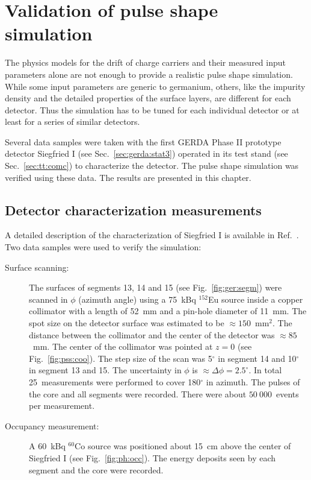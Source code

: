 \chapter{Validation of pulse shape simulation}
\label{cha:psa}
The physics models \cite{miha, bart} for the drift of charge carriers
and their measured input parameters \cite{miha, bart} alone are not
enough to provide a realistic pulse shape simulation. While some input
parameters are generic to germanium, others, like the impurity density
and the detailed properties of the surface layers, are different for
each detector. Thus the simulation has to be tuned for each individual
detector or at least for a series of similar detectors.

Several data samples were taken with the first GERDA Phase II
prototype detector Siegfried I (see Sec.~\ref{sec:gerda:stat3})
operated in its test stand (see Sec.~\ref{sec:tt:comc}) to
characterize the detector. The pulse shape simulation was verified
using these data. The results are presented in this chapter.

\section{Detector characterization measurements}
\label{sec:psa:char}
A detailed description of the characterization of Siegfried I is
available in Ref.~\cite{Sie07}. Two data samples were used to verify
the simulation:
\begin{description}
\item[Surface scanning:] The surfaces of segments 13, 14 and 15 (see
Fig.~\ref{fig:ger:segm}) were scanned in $\phi$ (azimuth angle) using
a 75~kBq $^{152}$Eu source inside a copper collimator with a length of
52~mm and a pin-hole diameter of 11~mm. The spot size on the detector
surface was estimated to be $\approx 150$~mm$^{2}$. The distance
between the collimator and the center of the detector was $\approx
85$~mm. The center of the collimator was pointed at $z = 0$ (see
Fig.~\ref{fig:pss:coo}).  The step size of the scan was 5$^{\circ}$ in
segment 14 and 10$^{\circ}$ in segment 13 and 15. The uncertainty in
$\phi$ is $\approx \Delta \phi=2.5^{\circ}$. In total 25~measurements
were performed to cover 180$^{\circ}$ in azimuth. The pulses of the
core and all segments were recorded. There were about $50\ 000$~events
per measurement.
\item[Occupancy measurement:] A 60~kBq $^{60}$Co source was positioned
about 15~cm above the center of Siegfried I (see
Fig.~\ref{fig:ph:occ}). The energy deposits seen by each segment and
the core were recorded.
\end{description}

